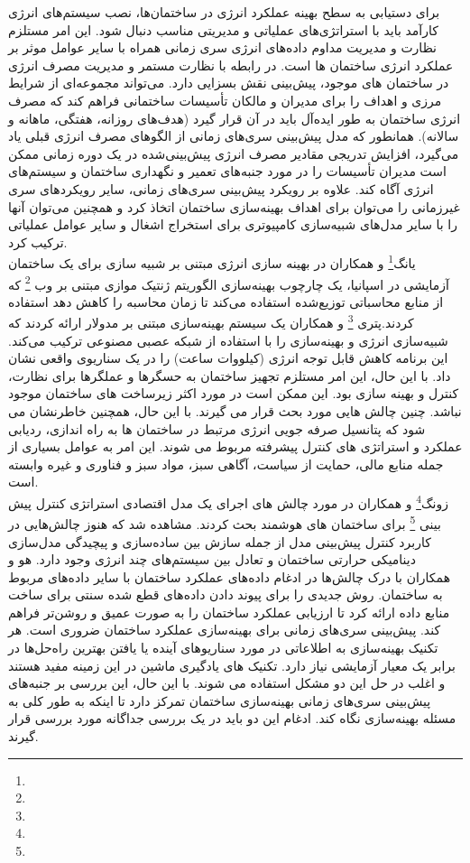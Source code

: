 برای دستیابی به سطح بهینه عملکرد انرژی در ساختمان‌ها، نصب سیستم‌های انرژی کارآمد باید با استراتژی‌های عملیاتی و مدیریتی مناسب دنبال شود. 
این امر مستلزم نظارت و مدیریت مداوم داده‌های انرژی سری زمانی همراه با سایر عوامل موثر بر عملکرد انرژی ساختمان ها است. 
در رابطه با نظارت مستمر و مدیریت مصرف انرژی در ساختمان های موجود، پیش‌بینی نقش بسزایی دارد. می‌تواند مجموعه‌ای از شرایط مرزی و اهداف را برای مدیران و 
مالکان تأسیسات ساختمانی فراهم کند که مصرف انرژی ساختمان به طور ایده‌آل باید در آن قرار گیرد (هدف‌های روزانه، هفتگی، ماهانه و سالانه). 
همانطور که مدل پیش‌بینی سری‌های زمانی از الگوهای مصرف انرژی قبلی یاد می‌گیرد، افزایش تدریجی مقادیر مصرف انرژی پیش‌بینی‌شده
 در یک دوره زمانی ممکن است مدیران تأسیسات را در مورد جنبه‌های تعمیر و نگهداری ساختمان و سیستم‌های انرژی آگاه کند. 
علاوه بر رویکرد پیش‌بینی سری‌های زمانی، سایر رویکردهای سری غیرزمانی را می‌توان برای اهداف بهینه‌سازی ساختمان اتخاذ کرد
 و همچنین می‌توان آنها را با سایر مدل‌های شبیه‌سازی کامپیوتری برای استخراج اشغال و
  سایر عوامل عملیاتی ترکیب کرد.
  \\
   یانگ\footnote{} و همکاران در بهینه سازی انرژی مبتنی بر شبیه سازی برای یک ساختمان آزمایشی در 
  اسپانیا، یک چارچوب بهینه‌سازی الگوریتم ژنتیک موازی
  مبتنی بر وب \footnote{} که از منابع محاسباتی توزیع‌شده استفاده می‌کند تا زمان محاسبه
   را کاهش دهد استفاده کردند.پتری \footnote{} و همکاران یک سیستم بهینه‌سازی مبتنی بر مدولار ارائه کردند
    که شبیه‌سازی انرژی و بهینه‌سازی را با استفاده از شبکه عصبی مصنوعی ترکیب می‌کند.
    این برنامه کاهش قابل توجه انرژی (کیلووات ساعت) را در یک سناریوی واقعی نشان داد.
    با این حال، این امر مستلزم تجهیز ساختمان به حسگرها و عملگرها برای نظارت، کنترل
    و بهینه سازی بود. این ممکن است در مورد اکثر زیرساخت های ساختمان موجود نباشد.
    چنین چالش هایی مورد بحث قرار می گیرند. با این حال، همچنین خاطرنشان می شود
    که پتانسیل صرفه جویی انرژی مرتبط در ساختمان ها به راه اندازی، ردیابی عملکرد
    و استراتژی های کنترل پیشرفته مربوط می شوند. این امر به عوامل بسیاری از جمله منابع مالی،
    حمایت از سیاست، آگاهی سبز، مواد سبز و فناوری و غیره وابسته است.
    \\
    زونگ\footnote{} و همکاران در مورد چالش های اجرای یک مدل اقتصادی 
    استراتژی کنترل پیش بینی \footnote{} برای ساختمان های هوشمند بحث کردند. مشاهده شد که هنوز چالش‌هایی
     در کاربرد کنترل پیش‌بینی مدل از جمله سازش بین ساده‌سازی و پیچیدگی مدل‌سازی 
    دینامیکی حرارتی ساختمان و تعادل بین سیستم‌های چند انرژی وجود دارد.
     هو و همکاران با درک چالش‌ها در ادغام داده‌های عملکرد ساختمان
     با سایر داده‌های مربوط به ساختمان. روش جدیدی را برای پیوند
     دادن داده‌های قطع شده سنتی برای ساخت منابع داده ارائه کرد تا 
    ارزیابی عملکرد ساختمان را به صورت عمیق و روشن‌تر فراهم کند. 
پیش‌بینی سری‌های زمانی برای بهینه‌سازی عملکرد ساختمان ضروری است. هر تکنیک بهینه‌سازی به
 اطلاعاتی در مورد سناریوهای آینده یا یافتن بهترین راه‌حل‌ها در برابر یک معیار
  آزمایشی نیاز دارد. تکنیک های یادگیری ماشین در این زمینه مفید هستند و اغلب در حل این دو مشکل استفاده می شوند. 
با این حال، این بررسی بر جنبه‌های پیش‌بینی سری‌های زمانی بهینه‌سازی ساختمان تمرکز دارد تا اینکه به طور کلی به مسئله بهینه‌سازی نگاه کند. ادغام این دو باید در یک بررسی جداگانه مورد بررسی قرار گیرند.



